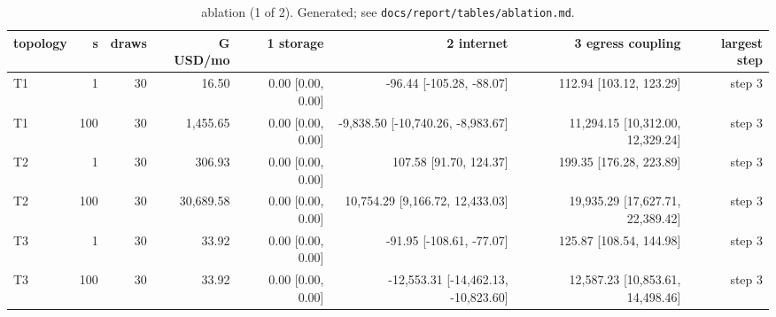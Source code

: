 \begin{table}[t]
\centering
\small
\begin{tabular}{lrrrrrrr}
\toprule
topology & s & draws & G USD/mo & 1 storage & 2 internet & 3 egress coupling & largest step \\
\midrule
T1 & 1 & 30 & 16.50 & 0.00 [0.00, 0.00] & -96.44 [-105.28, -88.07] & 112.94 [103.12, 123.29] & step 3 \\
T1 & 100 & 30 & 1,455.65 & 0.00 [0.00, 0.00] & -9,838.50 [-10,740.26, -8,983.67] & 11,294.15 [10,312.00, 12,329.24] & step 3 \\
T2 & 1 & 30 & 306.93 & 0.00 [0.00, 0.00] & 107.58 [91.70, 124.37] & 199.35 [176.28, 223.89] & step 3 \\
T2 & 100 & 30 & 30,689.58 & 0.00 [0.00, 0.00] & 10,754.29 [9,166.72, 12,433.03] & 19,935.29 [17,627.71, 22,389.42] & step 3 \\
T3 & 1 & 30 & 33.92 & 0.00 [0.00, 0.00] & -91.95 [-108.61, -77.07] & 125.87 [108.54, 144.98] & step 3 \\
T3 & 100 & 30 & 33.92 & 0.00 [0.00, 0.00] & -12,553.31 [-14,462.13, -10,823.60] & 12,587.23 [10,853.61, 14,498.46] & step 3 \\
\bottomrule
\end{tabular}
\caption{ablation (1 of 2). Generated; see \texttt{docs/report/tables/ablation.md}.}
\label{tab:ablation-1}
\end{table}

